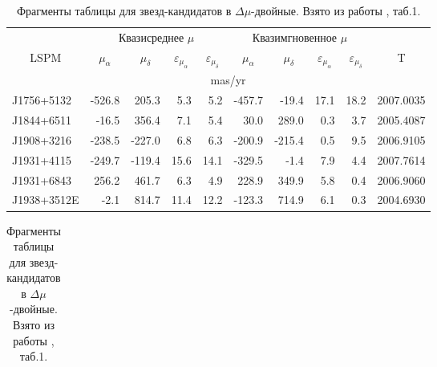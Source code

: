 \begin{table}[htbp]
\centering
\caption{Фрагменты таблицы для звезд-кандидатов в $\Delta\mu$-двойные.  Взято из работы \cite{2015AstL...41..833K}, таб.1.}
\label{tab:candidates}
\vspace{5mm}
\begin{tabularx}{\textwidth}{l|r|r|r|r|r|r|r|r|l} \hline
           & \multicolumn{4}{c|}{Квазисреднее $\mu$ } & \multicolumn{4}{c|}{Квазимгновенное $\mu$}& \\ \cline{2-9}
\multicolumn{1}{c|}{LSPM}&\multicolumn{1}{c|}{$\mu_\alpha$}&\multicolumn{1}{c|}{$\mu_\delta$}&\multicolumn{1}{c|}{$\varepsilon_{\mu_\alpha}$}&\multicolumn{1}{c|}{$\varepsilon_{\mu_\delta}$}&\multicolumn{1}{c|}{$\mu_\alpha$}&\multicolumn{1}{c|}{$\mu_\delta$}&\multicolumn{1}{c|}{$\varepsilon_{\mu_\alpha}$}&\multicolumn{1}{c|}{$\varepsilon_{\mu_\delta}$}&\multicolumn{1}{c}{T}\\ \cline{2-9}	   
	       &\multicolumn{8}{c|}{mas/yr}&\\ \hline  
J1756+5132 & -526.8&  205.3&  5.3&  5.2& -457.7&  -19.4& 17.1& 18.2& 2007.0035\\
J1844+6511 &  -16.5&  356.4&  7.1&  5.4&   30.0&  289.0&  0.3&  3.7& 2005.4087\\
J1908+3216 & -238.5& -227.0&  6.8&  6.3& -200.9& -215.4&  0.5&  9.5& 2006.9105\\
J1931+4115 & -249.7& -119.4& 15.6& 14.1& -329.5&   -1.4&  7.9&  4.4& 2007.7614\\
J1931+6843 &  256.2&  461.7&  6.3&  4.9&  228.9&  349.9&  5.8&  0.4& 2006.9060\\
J1938+3512E&   -2.1&  814.7& 11.4& 12.2& -123.3&  714.9&  6.1&  0.3& 2004.6930\\ \hline
\end{tabularx}
\begin{tabularx}{\textwidth}{l|r|c|r|r|r|r|r|r|l}


\end{tabularx}
\end{table}
